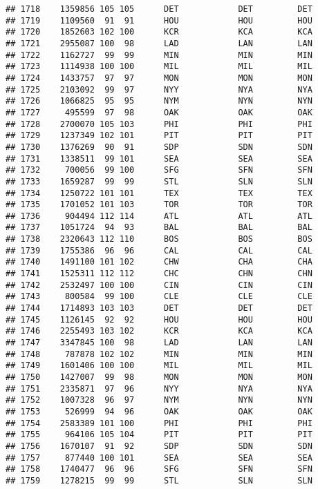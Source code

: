 \documentclass[]{article}
\begin{document}
\begin{verbatim}
## 1718    1359856 105 105      DET            DET         DET
## 1719    1109560  91  91      HOU            HOU         HOU
## 1720    1852603 102 100      KCR            KCA         KCA
## 1721    2955087 100  98      LAD            LAN         LAN
## 1722    1162727  99  99      MIN            MIN         MIN
## 1723    1114938 100 100      MIL            MIL         MIL
## 1724    1433757  97  97      MON            MON         MON
## 1725    2103092  99  97      NYY            NYA         NYA
## 1726    1066825  95  95      NYM            NYN         NYN
## 1727     495599  97  98      OAK            OAK         OAK
## 1728    2700070 105 103      PHI            PHI         PHI
## 1729    1237349 102 101      PIT            PIT         PIT
## 1730    1376269  90  91      SDP            SDN         SDN
## 1731    1338511  99 101      SEA            SEA         SEA
## 1732     700056  99 100      SFG            SFN         SFN
## 1733    1659287  99  99      STL            SLN         SLN
## 1734    1250722 101 101      TEX            TEX         TEX
## 1735    1701052 101 103      TOR            TOR         TOR
## 1736     904494 112 114      ATL            ATL         ATL
## 1737    1051724  94  93      BAL            BAL         BAL
## 1738    2320643 112 110      BOS            BOS         BOS
## 1739    1755386  96  96      CAL            CAL         CAL
## 1740    1491100 101 102      CHW            CHA         CHA
## 1741    1525311 112 112      CHC            CHN         CHN
## 1742    2532497 100 100      CIN            CIN         CIN
## 1743     800584  99 100      CLE            CLE         CLE
## 1744    1714893 103 103      DET            DET         DET
## 1745    1126145  92  92      HOU            HOU         HOU
## 1746    2255493 103 102      KCR            KCA         KCA
## 1747    3347845 100  98      LAD            LAN         LAN
## 1748     787878 102 102      MIN            MIN         MIN
## 1749    1601406 100 100      MIL            MIL         MIL
## 1750    1427007  99  98      MON            MON         MON
## 1751    2335871  97  96      NYY            NYA         NYA
## 1752    1007328  96  97      NYM            NYN         NYN
## 1753     526999  94  96      OAK            OAK         OAK
## 1754    2583389 101 100      PHI            PHI         PHI
## 1755     964106 105 104      PIT            PIT         PIT
## 1756    1670107  91  92      SDP            SDN         SDN
## 1757     877440 100 101      SEA            SEA         SEA
## 1758    1740477  96  96      SFG            SFN         SFN
## 1759    1278215  99  99      STL            SLN         SLN

\end{verbatim}
\end{document}
